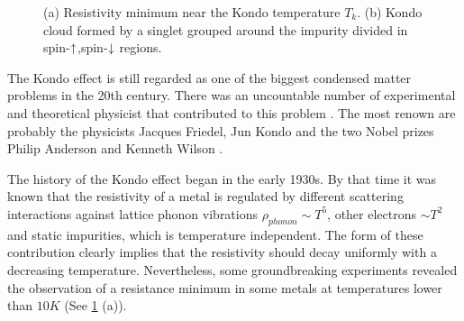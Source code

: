 \begin{figure}[t]
     \centering
    
     \caption{ \label{fig:Kondo} (a) Resistivity minimum near the Kondo temperature $T_k$. (b) Kondo cloud formed by a singlet grouped around the impurity divided in spin-$\uparrow$,spin-$\downarrow$ regions.   \protect{}}
\end{figure}


The Kondo effect is still regarded as one of the biggest condensed matter problems in the 20th century. There was an uncountable number of experimental and theoretical physicist that contributed to this problem . The most renown are probably the physicists Jacques Friedel, Jun Kondo and the two Nobel prizes Philip Anderson and Kenneth Wilson \citep{hewson_kondo_1997}. 

The history of the Kondo effect began in the early 1930s. By that time it was known that the resistivity of a metal is regulated by different scattering interactions against lattice phonon vibrations $\rho_{phonon} \sim T^5$, other electrons $\sim T^2$ and static impurities, which is temperature independent. The form of these contribution clearly implies that the resistivity should decay uniformly with a decreasing temperature. Nevertheless, some groundbreaking experiments revealed the observation of a resistance minimum in some metals at temperatures lower than $10K$ \cite{Kondo_deBoer1934}(See \ref{fig:Kondo} (a)). 

